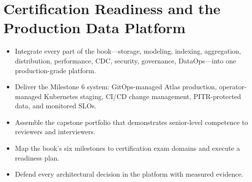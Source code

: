 \chapter{Certification Readiness and the Production Data Platform}
%

\begin{objectives}
\begin{itemize}
    \item Integrate every part of the book---storage, modeling, indexing, aggregation, distribution, performance, CDC, security, governance, DataOps---into one production-grade platform.
    \item Deliver the Milestone 6 system: GitOps-managed Atlas production, operator-managed Kubernetes staging, CI/CD change management, PITR-protected data, and monitored SLOs.
    \item Assemble the capstone portfolio that demonstrates senior-level competence to reviewers and interviewers.
    \item Map the book's six milestones to certification exam domains and execute a readiness plan.
    \item Defend every architectural decision in the platform with measured evidence.
\end{itemize}
\end{objectives}

